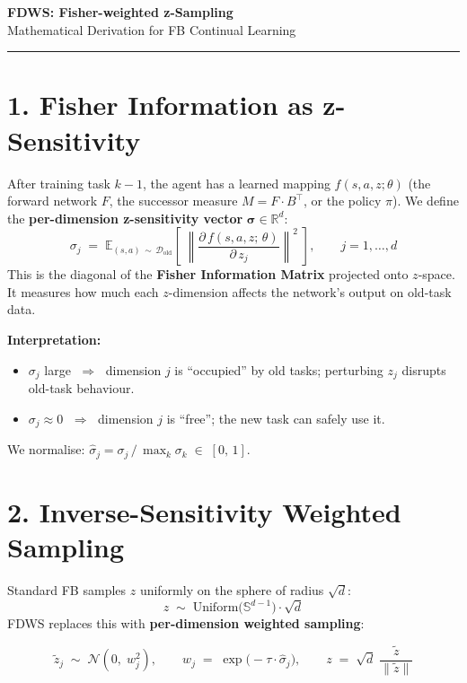 \documentclass[11pt]{article}
\newcommand{\E}{\mathbb{E}}
\newcommand{\R}{\mathbb{R}}
\newcommand{\Dold}{\mathcal{D}_{\text{old}}}
\begin{document}
\begin{center}
{\LARGE\textbf{FDWS: Fisher-weighted z-Sampling}}\\[6pt]
{\large Mathematical Derivation for FB Continual Learning}
\end{center}

\vspace{0.5em}
\noindent\rule{\textwidth}{0.5pt}

\section*{1.\; Fisher Information as z-Sensitivity}

After training task $k{-}1$, the agent has a learned mapping $f(s,a,z;\theta)$ (the forward network $F$, the successor measure $M = F\cdot B^\top$, or the policy $\pi$). We define the \textbf{per-dimension z-sensitivity vector} $\bm{\sigma} \in \R^d$:
\[
\sigma_j \;=\; \E_{(s,a)\,\sim\,\Dold}\!\left[\; \left\| \frac{\partial\, f(s,a,z;\,\theta)}{\partial\, z_j} \right\|^2 \;\right], \qquad j = 1,\ldots,d
\]
This is the diagonal of the \textbf{Fisher Information Matrix} projected onto $z$-space. It measures how much each $z$-dimension affects the network's output on old-task data.

\medskip
\noindent\textbf{Interpretation:}
\begin{itemize}
\item $\sigma_j$ large $\;\Rightarrow\;$ dimension $j$ is ``occupied'' by old tasks; perturbing $z_j$ disrupts old-task behaviour.
\item $\sigma_j \approx 0$ $\;\Rightarrow\;$ dimension $j$ is ``free''; the new task can safely use it.
\end{itemize}

\noindent We normalise: $\hat{\sigma}_j = \sigma_j \,/\, \max_k \sigma_k \;\in\; [0,\,1]$.

\section*{2.\; Inverse-Sensitivity Weighted Sampling}

Standard FB samples $z$ uniformly on the sphere of radius $\sqrt{d}$:
\[
z \;\sim\; \mathrm{Uniform}\!\bigl(\mathbb{S}^{d-1}\bigr) \cdot \sqrt{d}
\]
FDWS replaces this with \textbf{per-dimension weighted sampling}:

\begin{equation}
\boxed{\;
\tilde{z}_j \;\sim\; \mathcal{N}\!\left(0,\; w_j^2\right), \qquad
w_j \;=\; \exp\!\bigl(-\tau \cdot \hat{\sigma}_j\bigr), \qquad
z \;=\; \sqrt{d}\;\frac{\tilde{z}}{\|\tilde{z}\|}
\;}
\end{equation}
\end{document}
